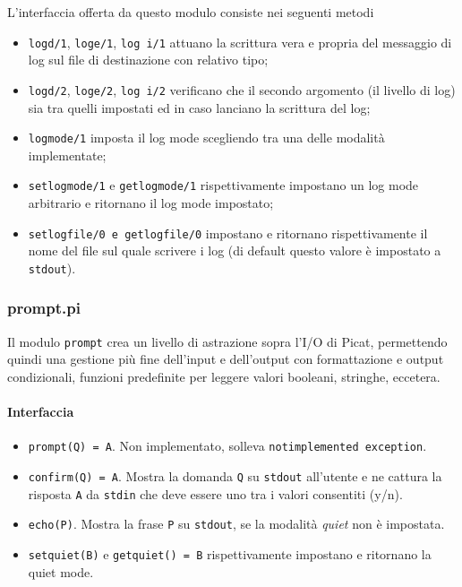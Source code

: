 \documentclass[12pt,a4paper,openright]{book}  %
\begin{document}
L'interfaccia offerta da questo modulo consiste nei seguenti metodi
\begin{itemize}
	\item \texttt{log\textunderscore d/1},
          \texttt{log\textunderscore e/1}, \texttt{log\textunderscore
            i/1} attuano la scrittura vera e propria del messaggio di
          log sul file di destinazione con relativo tipo;
	\item \texttt{log\textunderscore d/2},
          \texttt{log\textunderscore e/2}, \texttt{log\textunderscore
            i/2} verificano che il secondo argomento (il livello di
          log) sia tra quelli impostati ed in caso lanciano la
          scrittura del log;
	\item \texttt{log\textunderscore mode/1} imposta il log mode
          scegliendo tra una delle modalità implementate;
	\item \texttt{set\textunderscore log\textunderscore mode/1} e
          \texttt{get\textunderscore log\textunderscore mode/1}
          rispettivamente impostano un log mode arbitrario e ritornano
          il log mode impostato;
	\item \texttt{set\textunderscore log\textunderscore file/0 e
          get\textunderscore log\textunderscore file/0} impostano e
          ritornano rispettivamente il nome del file sul quale
          scrivere i log (di default questo valore è impostato a
          \texttt{stdout}).
\end{itemize}

\subsubsection{prompt.pi}

Il modulo \texttt{prompt} crea un livello di astrazione sopra l'I/O di
Picat, permettendo quindi una gestione più fine dell'input e
dell'output con formattazione e output condizionali, funzioni
predefinite per leggere valori booleani, stringhe, eccetera.

\paragraph{Interfaccia}

\begin{itemize}
	\item \texttt{prompt(Q) = A}. Non implementato, solleva
          \texttt{not\textunderscore implemented\textunderscore
            exception}.
	\item \texttt{confirm(Q) = A}. Mostra la domanda \texttt{Q} su
          \texttt{stdout} all'utente e ne cattura la risposta
          \texttt{A} da \texttt{stdin} che deve essere uno tra i
          valori consentiti (y/n).
	\item \texttt{echo(P)}. Mostra la frase \texttt{P} su
          \texttt{stdout}, se la modalità \emph{quiet} non è
          impostata.
	\item \texttt{set\textunderscore quiet(B)} e
          \texttt{get\textunderscore quiet() = B} rispettivamente
          impostano e ritornano la quiet mode.
\end{itemize}
\end{document}
